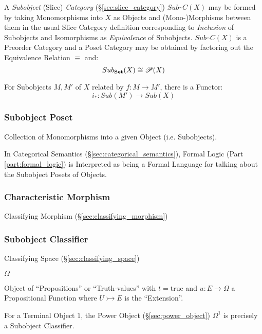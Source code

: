 A \emph{Subobject} (Slice) \emph{Category}
(\S\ref{sec:slice_category}) $Sub_\cat{C}(X)$ may be formed by
taking Monomorphisms into $X$ as Objects and (Mono-)Morphisms between
them in the usual Slice Category definition corresponding to
\emph{Inclusion} of Subobjects and Isomorphisms as \emph{Equivalence}
of Subobjects. $Sub_\cat{C}(X)$ is a Preorder Category and a Poset
Category may be obtained by factoring out the Equivalence Relation
$\equiv$ and:
\[
  Sub_\mathbf{Set}(X) \cong \mathscr{P}(X)
\]

For Subobjects $M,M'$ of $X$ related by $f : M \rightarrow M'$, there
is a Functor:
\[
  i_* : Sub (M') \rightarrow Sub (X)
\]



\subsubsection{Subobject Poset}\label{sec:subobject_poset}

Collection of Monomorphisms into a given Object (i.e. Subobjects).

In Categorical Semantics (\S\ref{sec:categorical_semantics}), Formal
Logic (Part \ref{part:formal_logic}) is Interpreted as being a Formal
Language for talking about the Subobject Posets of Objects.



\subsubsection{Characteristic Morphism}
\label{sec:characteristic_morphism}

Classifying Morphism (\S\ref{sec:classifying_morphism})



\subsubsection{Subobject Classifier}\label{sec:subobject_classifier}

Classifying Space (\S\ref{sec:classifying_space})

$\Omega$

Object of ``Propositions'' or ``Truth-values'' with $t =
\mathrm{true}$ and $u : E \rightarrow \Omega$ a Propositional Function
where $U \rightarrowtail E$ is the ``Extension''.

For a Terminal Object $1$, the Power Object (\S\ref{sec:power_object})
$\Omega^1$ is precisely a Subobject Classifier.



